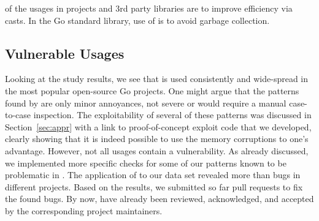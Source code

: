 \begin{tcolorbox}[boxsep=1pt, enlarge top by=5pt, title=Answer to \ref{rq:purpose}]
 of the \unsafe{} usages in projects and 3rd party libraries are to improve efficiency via \unsafe{} casts.
In the Go standard library,  use of \unsafe{} is to avoid garbage collection. 
\end{tcolorbox}


\subsection{Vulnerable Usages}
\label{sec:discussion}
Looking at the study results, we see that \unsafe{} is used consistently and wide-spread in the most popular open-source Go projects.
One might argue that the patterns found by \toolUsage{} are only minor annoyances, not severe or would require a manual case-to-case inspection. 
The exploitability of several of these patterns was discussed in Section~\ref{sec:appr} with a link to proof-of-concept exploit code that we developed, clearly showing that it is indeed possible to use the memory corruptions to one's advantage.
However, not all \unsafe{} usages contain a vulnerability. 
As already discussed, we implemented more specific checks for some of our patterns known to be problematic in \toolSA{}.
The application of \toolSA{} to our data set revealed more than \numberBugsFixed{} bugs in different projects.
Based on the results, we submitted so far \numberPRs{} pull requests to fix the found bugs. %
By now, \numberPRsMerged{} have already been reviewed, acknowledged, and accepted by the corresponding project maintainers.